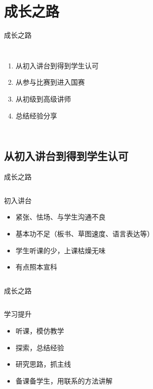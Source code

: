 \documentclass[14pt]{beamer}
\begin{document}
\section{成长之路}

\begin{frame}{成长之路}
\begin{columns}
	\begin{enumerate}
		\item 从初入讲台到得到学生认可
		\item 从参与比赛到进入国赛
		\item 从初级到高级讲师
		\item 总结经验分享
	\end{enumerate}
\end{columns}
\end{frame}

\subsection{从初入讲台到得到学生认可}

\begin{frame}{成长之路}
\begin{columns}
    \begin{block}{\centering 初入讲台}
    	\begin{itemize}[<+->]
    		\item 紧张、怯场、与学生沟通不良
    		\item 基本功不足（板书、草图速度、语言表达等）
    		\item 学生听课的少，上课枯燥无味
    		\item 有点照本宣科
    	\end{itemize}
	\end{block}
\end{columns}
\end{frame}

\begin{frame}{成长之路}
\begin{columns}
	\begin{block}{\centering 学习提升}
		\begin{itemize}[<+->]
			\item 听课，模仿教学
			\item 探索，总结经验
			\item 研究思路，抓主线
			\item 备课备学生，用联系的方法讲解
		\end{itemize}
	\end{block}
\end{columns}
\end{frame}
\end{document}
